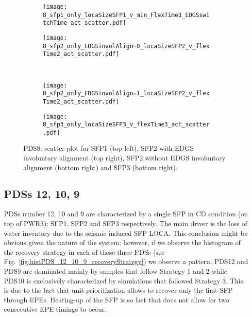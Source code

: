 \begin{figure}
  \begin{subfigure}{.5\linewidth}
    \centering
    \texttt{[image: 8\_sfp1\_only\_locaSizeSFP1\_v\_min\_FlexTime1\_EDGSswitchTime\_act\_scatter.pdf]}
  \end{subfigure}%
  \begin{subfigure}{.5\linewidth}
    \centering
    \texttt{[image: 8\_sfp2\_only\_EDGSinvolAlign=0\_locaSizeSFP2\_v\_flexTime2\_act\_scatter.pdf]}
  \end{subfigure}\\[1ex]
  \begin{subfigure}{.5\linewidth}
    \centering
    \texttt{[image: 8\_sfp2\_only\_EDGSinvolAlign=1\_locaSizeSFP2\_v\_flexTime2\_act\_scatter.pdf]}
  \end{subfigure}
  \begin{subfigure}{.5\linewidth}
    \centering
    \texttt{[image: 8\_sfp3\_only\_locaSizeSFP3\_v\_flexTime3\_act\_scatter.pdf]}
  \end{subfigure}
  \caption{PDS8: scatter plot for SFP1 (top left), SFP2 with EDGS involuntary alignment (top right), 
           SFP2 without EDGS involuntary alignment (bottom right) and SFP3 (bottom right).}
  \label{fig:scatterPDS8}
\end{figure}  

\subsection{PDSs 12, 10, 9}
PDSs number 12, 10 and 9 are characterized by a single SFP in CD condition (on top of PWR3): SFP1, 
SFP2 and SFP3 respectively. The main driver is the loss of water inventory due to the seismic induced
SFP LOCA.
This conclusion might be obvious given the nature of the system; however, if we observe the 
histogram of the recovery strategy in each of these three PDSs 
(see Fig.~\ref{fig:histPDS_12_10_9_recoveryStrategy}) we observe a pattern.
PDS12 and PDS9 are dominated mainly by samples that follow Strategy 1 and 2 while PDS10 is 
exclusively characterized by simulations that followed Strategy 3.
This is due to the fact that unit prioritization allows to recover only the first SFP through EPEs. 
Heating-up of the SFP is so fast that does not allow for two consecutive 
EPE timings to occur.

